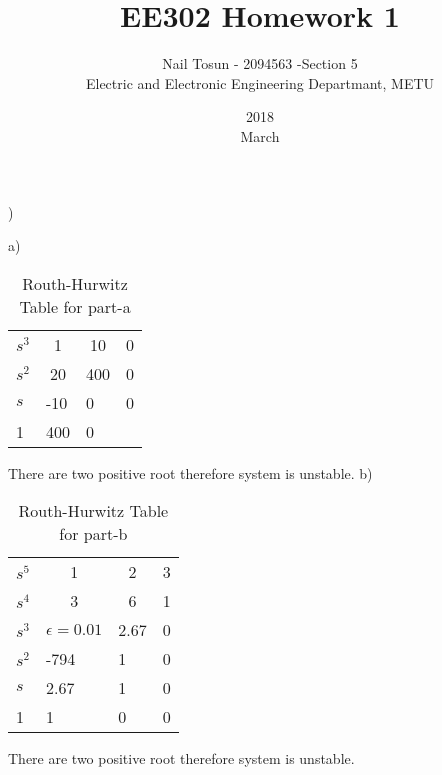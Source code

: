 \documentclass[11pt]{article}
\title{EE302 Homework 1}
\date{2018\\ March}
\author{Nail Tosun - 2094563 -Section 5\\ Electric and Electronic Engineering Departmant, METU}
\begin{document}
)

a)
\begin{table}[H]
\centering
\caption{Routh-Hurwitz Table for part-a}
\label{my-label}
\begin{tabular}{llll}
$s^3$ & \multicolumn{1}{c}{1}  & \multicolumn{1}{c}{10}  & \multicolumn{1}{c}{0} \\
$s^2$ & \multicolumn{1}{c}{20} & \multicolumn{1}{c}{400} & \multicolumn{1}{c}{0} \\
$s$   & -10                    & 0                       & 0                     \\
1     & 400                    & 0                       &                      
\end{tabular}
\end{table}
There are two positive root therefore system is unstable.
b)

\begin{table}[H]
\centering
\caption{Routh-Hurwitz Table for part-b}
\label{my-label}
\begin{tabular}{llll}
$s^5$ & \multicolumn{1}{c}{1} & \multicolumn{1}{c}{2} & \multicolumn{1}{c}{3} \\
$s^4$ & \multicolumn{1}{c}{3} & \multicolumn{1}{c}{6} & \multicolumn{1}{c}{1} \\
$s^3$   & $\epsilon=0.01$                 & 2.67                  & 0                     \\
$s^2$     & -794                  & 1                     & 0                     \\
$s$   & 2.67                  & 1                     & 0                     \\
1  & 1                     & 0                     & 0                    
\end{tabular}
\end{table}
There are two positive root therefore system is unstable.
\end{document}

